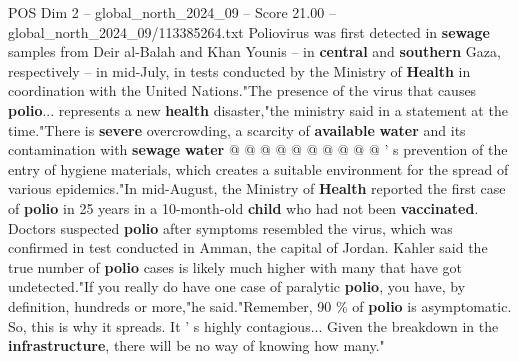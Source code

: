 \begin{textsample}{POS Dim 2 – global\_north\_2024\_09 – Score 21.00 – global\_north\_2024\_09/113385264.txt}
Poliovirus was first detected in \textbf{sewage} samples from Deir al-Balah and Khan Younis -- in \textbf{central} and \textbf{southern} Gaza, respectively -- in mid-July, in tests conducted by the Ministry of \textbf{Health} in coordination with the United Nations."The presence of the virus that causes \textbf{polio}... represents a new \textbf{health} disaster,"the ministry said in a statement at the time."There is \textbf{severe} overcrowding, a scarcity of \textbf{available} \textbf{water} and its contamination with \textbf{sewage} \textbf{water} @ @ @ @ @ @ @ @ @ @ ' s prevention of the entry of hygiene materials, which creates a suitable environment for the spread of various epidemics."In mid-August, the Ministry of \textbf{Health} reported the first case of \textbf{polio} in 25 years in a 10-month-old \textbf{child} who had not been \textbf{vaccinated}.
Doctors suspected \textbf{polio} after symptoms resembled the virus, which was confirmed in test conducted in Amman, the capital of Jordan.
Kahler said the true number of \textbf{polio} cases is likely much higher with many that have got undetected."If you really do have one case of paralytic \textbf{polio}, you have, by definition, hundreds or more,"he said."Remember, 90 \% of \textbf{polio} is asymptomatic.
So, this is why it spreads.
It ' s highly contagious...
Given the breakdown in the \textbf{infrastructure}, there will be no way of knowing how many."

\end{textsample}
